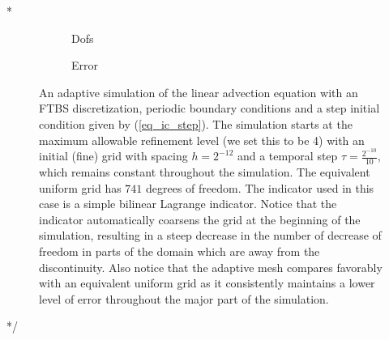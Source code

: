 \documentclass[final]{amsart}
\numberwithin{equation}{section}
\begin{document}
\/*
\begin{figure}[H]
	\begin{subfigure}[b]{.41\textwidth}
		\centering
		\caption{\label{fig:FTBS_adapt_dofs}Dofs}
	\end{subfigure}
	\begin{subfigure}[b]{.41\textwidth}\label{fig:FTBS_adapt_error}
		\centering
		\caption{Error}
	\end{subfigure}
	\caption{\label{fig:FTBS_linadvect_adapts} An adaptive simulation of the linear advection equation with an FTBS discretization, periodic boundary conditions and a step initial condition given by (\ref{eq_ic_step}).  The simulation starts at the maximum allowable refinement level (we set this to be 4) with an initial (fine) grid with spacing $h=2^{-12}$ and a temporal step $\tau =\frac{2^{-10}}{10}$, which remains constant throughout the simulation. The equivalent uniform grid has $741$ degrees of freedom.  The indicator used in this case is a simple bilinear Lagrange indicator.  Notice that the indicator automatically coarsens the grid at the beginning of the simulation, resulting in a steep decrease in the number of decrease of freedom in parts of the domain which are away from the discontinuity. Also notice that the adaptive mesh compares favorably with an equivalent uniform grid as it consistently maintains a lower level of error throughout the major part of the simulation.}
\end{figure}
*/
\end{document}
